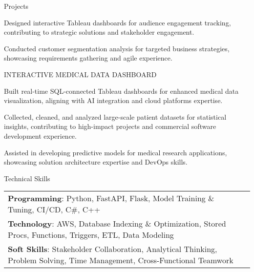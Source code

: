 \documentclass{resume} %
\begin{document}
\begin{rSection}{Projects}
\begin{rSubsection}
                                    \item Designed interactive Tableau dashboards for audience engagement tracking, contributing to strategic solutions and stakeholder engagement.
                                    \item Conducted customer segmentation analysis for targeted business strategies, showcasing requirements gathering and agile experience.
                            \end{rSubsection}
                    \begin{rSubsection}
                                    {INTERACTIVE MEDICAL DATA DASHBOARD}
                                {}{}{}
                                    \item Built real{-}time SQL{-}connected Tableau dashboards for enhanced medical data visualization, aligning with AI integration and cloud platforms expertise.
                                    \item Collected, cleaned, and analyzed large{-}scale patient datasets for statistical insights, contributing to high{-}impact projects and commercial software development experience.
                                    \item Assisted in developing predictive models for medical research applications, showcasing solution architecture expertise and DevOps skills.
                            \end{rSubsection}
            \end{rSection}

    \begin{rSection}{Technical Skills}
        \begin{tabular}{ @{} l @{	} l }
                                \textbf{Programming}: Python, FastAPI, Flask, Model Training \& Tuning, CI/CD, C\#, C++\\
                                \textbf{Technology}: AWS, Database Indexing \& Optimization, Stored Procs, Functions, Triggers, ETL, Data Modeling\\
                                \textbf{Soft Skills}: Stakeholder Collaboration, Analytical Thinking, Problem Solving, Time Management, Cross{-}Functional Teamwork\\
        \end{tabular}
    \end{rSection}
\end{document}
